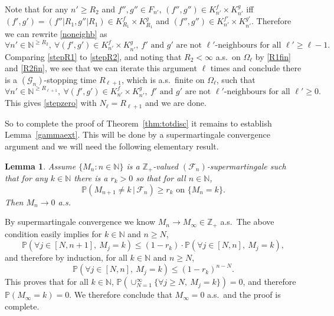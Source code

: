 \documentclass[12pt]{article}
\makeatletter
\renewenvironment{proof}[1][\proofname]{%
\par\pushQED{\qed}\normalfont%
\topsep6\p@\@plus6\p@\relax
\trivlist\item[\hskip\labelsep\bfseries#1\@addpunct{.}]%
\ignorespaces
}{%
\popQED\endtrivlist\@endpefalse
}
\numberwithin{theorem}{section}
\newtheorem{lemma}[theorem]{Lemma}
\theoremstyle{def}
\numberwithin{equation}{section}
\renewcommand{\P}{\mathbb{P}}
\newcommand{\Z}{\mathbb{Z}}
\newcommand{\N}{\mathbb{N}}
\newcommand{\cF}{\mathcal F}
\newcommand{\cG}{\mathcal G}
\makeatother
\begin{document}
\begin{proof}[Proof of Lemma~\ref{disjcells}]
Note that for any $n'\ge R_2$ and $f'',g''\in F_{n'}$, $(f'',g'')\in K^f_{n'}\times K^g_{n'}$ iff $(f',g')=(f''|R_1,g''|R_1)\in K^f_{R_1}\times K^g_{R_1}$ and $(f'',g'')\in K_{n'}^{f'}\times K_{n'}^{g'}$.  
Therefore we can rewrite \eqref{noneighb} as 
\begin{equation}\label{stepR2} \forall n'\in\N^{\ge R_2}, \ \forall (f',g')\in K_{n'}^f\times K_{n'}^g, \ f'\text{ and }g'\text{ are not $\ell'$-neighbours for all }\ell'\ge \ell-1.
\end{equation}
Comparing \eqref{stepR1} to \eqref{stepR2}, and noting that $R_2<\infty$ a.s.\ on $\Omega_\ell$ by \eqref{R1fin} and \eqref{R2fin},  we see that we can iterate this argument $\ell$ times and conclude there is a $(\cG_n)$-stopping time $R_{\ell+1}$, which is a.s.\ finite on $\Omega_\ell$, such that
\begin{equation*}
\forall n'\in\N^{\ge R_{\ell+1}}, \ \forall (f',g')\in K^f_{n'}\times K^g_{n'}, \ f'\text{ and }g'\text{ are not $\ell'$-neighbours for all }\ell'\ge 0.
\end{equation*}
This gives \eqref{stepzero} with $N_\ell=R_{\ell+1}$ and we are done.
\end{proof}

So to complete the proof of Theorem~\ref{thm:totdisc} it remains to establish Lemma~\ref{gammaext}. This will be done by a supermartingale convergence argument and we will need the following elementary result.

\begin{lemma}\label{supermart} Assume $\{M_n:n\in\N\}$ is a $\Z_+$-valued $(\cF_n)$-supermartingale such that for any $k\in\N$ there is a $r_k>0$ so that for all $n\in\N$,
\begin{equation}\label{martcond}\P(M_{n+1}\neq k \, | \, \cF_n)\ge r_k\text{ on }\{M_n=k\}.
\end{equation}
Then $M_n\to 0$ a.s.
\end{lemma}
\begin{proof} By supermartingale convergence we know $M_n\to M_\infty\in\Z_+$ a.s.\ The above condition easily implies for $k\in\N$ and $n\ge N$,
\[\P(\forall j\in[N,n+1], \ M_j=k)\le (1-r_k)\cdot\P(\forall j\in[N,n], \ M_j=k),\]
and therefore by induction, for all $k\in\N$ and $n\ge N$,
\[\P(\forall j\in[N,n], \ M_j=k )\le (1-r_k)^{n-N}.\] 
This proves that for all $k\in \N$, $\P(\cup_{N=1}^\infty\{\forall j\ge N, \ M_j=k \})=0$, and therefore \break
$\P(M_\infty=k)=0$.  We therefore conclude that $M_\infty=0$ a.s.\ and the proof is complete.
\end{proof}
\end{document}
